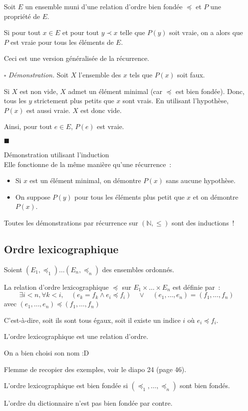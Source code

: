 \documentclass[a4paper, titlepage]{article}
\newenvironment{lititle}%
{\vspace{7mm}\LobsterTwo \large}%
{\\}
\renewenvironment{proof}{\par$\square$ \footnotesize\textit{Démonstration.}}{\begin{flushright}$\blacksquare$\end{flushright}\par}
\begin{document}
    \begin{thm}[Induction]
        Soit $E$ un ensemble muni d'une relation d'ordre bien fondée $\preceq$ et $P$ une propriété de $E$.

        Si pour tout $x\in E$ et pour tout $y \prec x$ telle que $P(y)$ soit vraie, on a alors que $P$ est vraie pour
        tous les éléments de $E$.
    \end{thm}
    Ceci est une version généralisée de la récurrence.
    \begin{proof}
        Soit $X$ l'ensemble des $x$ tels que $P(x)$ soit faux.

        Si $X$ est non vide, $X$ admet un élément minimal (car $\preceq$ est bien fondée).
        Donc, tous les $y$ strictement plus petits que $x$ sont vrais.
        En utilisant l'hypothèse, $P(x)$ est aussi vraie.
        $X$ est donc vide.

        Ainsi, pour tout $e\in E$, $P(e)$ est vraie.
    \end{proof}
    \begin{lititle}
        Démonstration utilisant l'induction
    \end{lititle}
    Elle fonctionne de la même manière qu'une récurrence~:
    \begin{itemize}
        \item Si $x$ est un élément minimal, on démontre $P(x)$ sans aucune hypothèse.
        \item On suppose $P(y)$ pour tous les éléments plus petit que $x$ et on démontre $P(x)$.
    \end{itemize}
    \begin{exemple}
        Toutes les démonstrations par récurrence sur $(\mathbb{N},\leqslant)$ sont des inductions~!
    \end{exemple}
    \subsection{Ordre lexicographique}
    \begin{defn}
        Soient $(E_1,\preceq_1)\ldots(E_n,\preceq_n)$ des ensembles ordonnés.

        La relation d'ordre lexicographique $\preceq$ sur $E_1\times\ldots\times E_n$ est définie par~:
        $$ \exists i<n,\forall k<i, \quad (e_k=f_k\land e_i\preceq f_i)\quad\lor\quad(e_1,\ldots,e_n) = (f_1,\ldots,f_n)$$
        avec $(e_1,\ldots,e_n)\preceq(f_1,\ldots,f_n)$
    \end{defn}
    C'est-à-dire, soit ils sont tous égaux, soit il existe un indice $i$ où $e_i \preceq f_i$.
    \begin{props}
        L'ordre lexicographique est une relation d'ordre.
    \end{props}
    On a bien choisi son nom :D
    \begin{exemple}
        Flemme de recopier des exemples, voir le diapo 24 (page 46).
    \end{exemple}
    \begin{thm}
        L'ordre lexicographique est bien fondée si $(\preceq_1,\ldots,\preceq_n)$ sont bien fondés.
    \end{thm}
    L'ordre du dictionnaire n'est pas bien fondée par contre.
\end{document}

